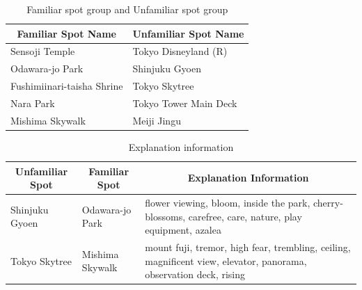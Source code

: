 \documentclass[journal]{IAENGtran}
\begin{document}
\begin{table}[t]
  \caption{Familiar spot group and Unfamiliar spot group}
  \label{table:Familiar spot group and Unfamiliar spot group}
  \centering
  \begin{tabular}{l|l}
  \hline
  \multicolumn{1}{c|}{Familiar Spot Name} & \multicolumn{1}{c}{Unfamiliar Spot Name} \\ \hline
  Sensoji Temple                          & Tokyo Disneyland (R)                     \\
  Odawara-jo Park                         & Shinjuku Gyoen                           \\
  Fushimiinari-taisha Shrine              & Tokyo Skytree                            \\
  Nara Park                               & Tokyo Tower Main Deck            \\
  Mishima Skywalk                         & Meiji Jingu                              \\ \hline
  \end{tabular}
\end{table}

\begin{table}[t]
  \caption{Explanation information}
  \label{table:Explanation information}
  \centering
  \begin{tabular}{l|l|l}
  \hline
  \multicolumn{1}{c|}{Unfamiliar Spot} & \multicolumn{1}{c|}{Familiar Spot} & \multicolumn{1}{c}{Explanation Information}                     \\ \hline
  Shinjuku Gyoen                      & Odawara-jo Park                         & flower viewing, bloom, inside the park, cherry-blossoms, carefree, care, nature, play equipment, azalea          \\ \hline
  Tokyo Skytree                     & Mishima Skywalk                    & mount fuji, tremor, high fear, trembling, ceiling, magnificent view, elevator, panorama, observation deck, rising
 \\ \hline
  \end{tabular}
\end{table}
\end{document}
